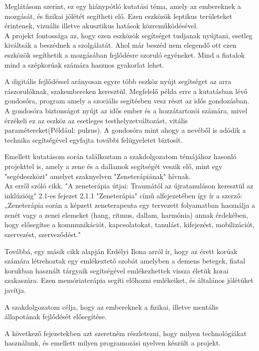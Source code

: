 \documentclass[tocnopagenum]{thesis-ekf}
\theoremstyle{definition}
\theoremstyle{remark}
\begin{document}
	Meglátásom szerint, ez egy hiánypótló kutatási téma, amely az embereknek a mozgását, és fizikai jólétét segítheti elő.
	Ezen eszközök leptikus területeket érintenek, vizuális illetve akusztikus hatások közreműködésével.
	\\
	A projekt fontossága az, hogy ezen eszközök segítséget tudjanak nyújtani, esetleg kiváltsák a beszédnek a szolgálatát. Ahol már beszéd nem elegendő ott ezen eszközök segíthetik a mozgásában fejlődésre szoruló egyéneket. Mind a fiatalok mind a szépkorúak számára hasznos gyakorlat lehet.
	\par
	A digitális fejlődéssel arányosan egyre több eszköz nyújt segítséget az arra rászorulóknak, szakembereken keresztül. Megfelelő példa erre a kutatásban lévő gondosóra, program amely a szociális segítésben vesz részt az idős gondozásban. A gondosóra biztonságot nyújt az idős ember és a hozzátartozói számára, mivel érzékeli ez az eszköz az esetleges testhelyzetváltozást, vitális paramétereket(Például: pulzus). A gondosóra mint ahogy a nevéből is adódik a technika segítségével egyfajta további felügyeletet biztosít.\cite{MTI}
	\par
	Emellett kutatásom során találkoztam a szakdolgozatom témájához hasonló projekttel is, amely a zene és a dallamok segítségét veszik elő, mint egy "segédeszközt" amelyet szaknyelven "Zeneterápiának" hívnak.\cite{zsofia2021zeneterapia}
	\\
	Az erről szóló cikk, "A zeneterápia útjai: Traumától az újratanuláson keresztül az inklúzióig" 2.1-es fejezet 2.1.1 "Zeneterápia" című alfejezetében így ír a szerző:
	„Zeneterápia során a képzett zeneterapeuta egy tervezett folyamatban használja a zenét vagy a zenei elemeket (hang, ritmus, dallam, harmónia) annak érdekében, hogy elősegítse a kommunikációt, kapcsolatokat, tanulást, kifejezést, mobilizációt, szervezést, szerveződést."
	\par
	Továbbá, egy másik cikk alapján Erdélyi Ilona arról ír, hogy az érett korúak számára létrehoztak egy emlékeztető szobát amelyben a demens betegek, fiatal korukban használt tárgyaik segítségével emlékezhettek vissza életük korai szakaszára. Ezen memóriaterápia segíti előhozni emlékeiket, és általános jólétüket javítja.\cite{erdelyiilonademensbetegek}
	
	A szakdolgozatom célja, hogy az embereknek a fizikai, illetve mentális állapotának fejlődését elősegítése.
	\par 
	
	A következő fejezetekben azt szeretném részletezni, hogy milyen technológiákat használunk, és emellett milyen programozási nyelven készült a projekt. \\ 
\end{document}
